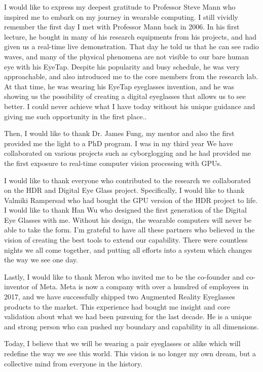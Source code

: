 I would like to express my deepest gratitude to Professor Steve Mann who inspired me to embark on my journey in wearable computing. I still vividly remember the first day I met with Professor Mann back in 2006. In his first lecture, he bought in many of his research equipments from his projects, and had given us a real-time live demonstration. That day he told us that he can see radio waves, and many of the physical phenomena are not visible to our bare human eye with his EyeTap. Despite his popularity and busy schedule, he was very approachable, and also introduced me to the core members from the research lab. At that time, he was wearing his EyeTap eyeglasses invention, and he was showing us the possibility of creating a digital eyeglasses that allows us to see better. I could never achieve what I have today without his unique guidance and giving me such opportunity in the first place.. 

Then, I would like to thank Dr. James Fung, my mentor and also the first provided me the light to a PhD program. I was in my third year  We have collaborated on various projects such as cyborglogging and he had provided me the first exposure to real-time computer vision processing with GPUs.

I would like to thank everyone who contributed to the research we collaborated on the HDR and Digital Eye Glass project. Specifically, I would like to thank Valmiki Rampersad who had bought the GPU version of the HDR project to life. I would like to thank Han Wu who designed the first generation of the Digital Eye Glasses with me. Without his design, the wearable computers will never be able to take the form. I'm grateful to have all these partners who believed in the vision of creating the best tools to extend our capability. There were countless nights we all come together, and putting all efforts into a system which changes the way we see one day.
 
Lastly, I would like to thank Meron who invited me to be the co-founder and co-inventor of Meta. Meta is now a company with over a hundred of employees in 2017, and we have successfully shipped two Augmented Reality Eyeglasses products to the market. This experience had bought me insight and core validation about what we had been pursuing for the last decade. He is a unique and strong person who can pushed my boundary and capability in all dimensions.

Today, I believe that we will be wearing a pair eyeglasses or alike which will redefine the way we see this world. This vision is no longer my own dream, but a collective mind from everyone in the history.